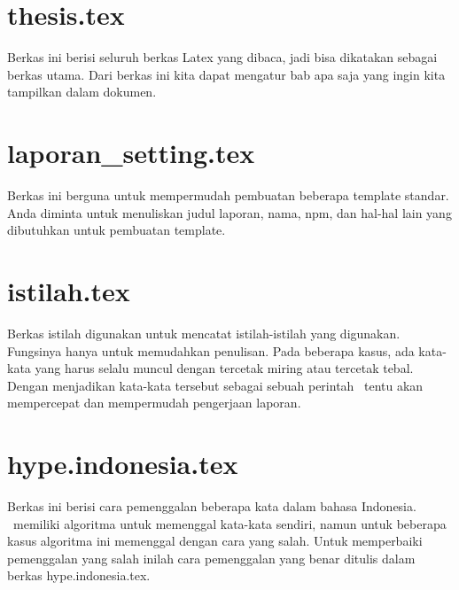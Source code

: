     \section{thesis.tex}
    Berkas ini berisi seluruh berkas Latex yang dibaca, jadi bisa dikatakan sebagai
    berkas utama. Dari berkas ini kita dapat mengatur bab apa saja yang ingin
    kita tampilkan dalam dokumen.


    \section{laporan\_setting.tex}
    Berkas ini berguna untuk mempermudah pembuatan beberapa template standar.
    Anda diminta untuk menuliskan judul laporan, nama, npm, dan hal-hal lain yang
    dibutuhkan untuk pembuatan template.


    \section{istilah.tex}
    Berkas istilah digunakan untuk mencatat istilah-istilah yang digunakan.
    Fungsinya hanya untuk memudahkan penulisan.
    Pada beberapa kasus, ada kata-kata yang harus selalu muncul dengan tercetak
    miring atau tercetak tebal.
    Dengan menjadikan kata-kata tersebut sebagai sebuah perintah \latex~tentu akan
    mempercepat dan mempermudah pengerjaan laporan.


    \section{hype.indonesia.tex}
    Berkas ini berisi cara pemenggalan beberapa kata dalam bahasa Indonesia.
    \latex~memiliki algoritma untuk memenggal kata-kata sendiri, namun untuk
    beberapa kasus algoritma ini memenggal dengan cara yang salah.
    Untuk memperbaiki pemenggalan yang salah inilah cara pemenggalan yang benar
    ditulis dalam berkas hype.indonesia.tex.


